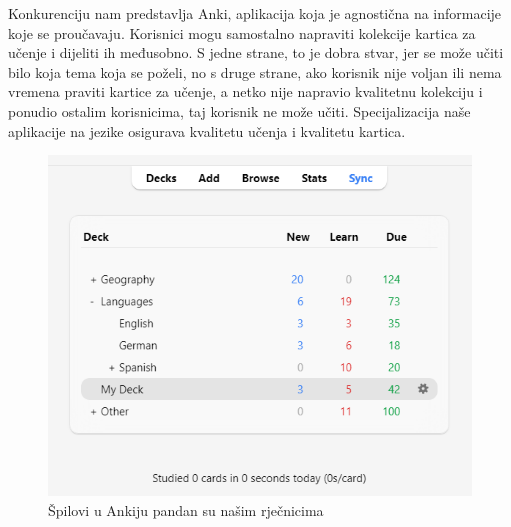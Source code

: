 Konkurenciju nam predstavlja Anki, aplikacija koja je agnostična na informacije koje se proučavaju. Korisnici mogu samostalno 
napraviti kolekcije kartica za učenje i dijeliti ih međusobno. S jedne strane, to je dobra stvar, jer se može učiti bilo koja tema koja 
se poželi, no s druge strane, ako korisnik nije voljan ili nema vremena praviti kartice za učenje, a netko nije napravio kvalitetnu kolekciju i 
ponudio ostalim korisnicima, taj korisnik ne može učiti. Specijalizacija naše aplikacije na jezike osigurava kvalitetu učenja i kvalitetu kartica.

\begin{figure}[H]
	\includegraphics[scale=0.8]{slike/anki_screen.png} 
	\centering
	\caption{Špilovi u Ankiju pandan su našim rječnicima}
	\label{fig:ankideck}
\end{figure}

\eject